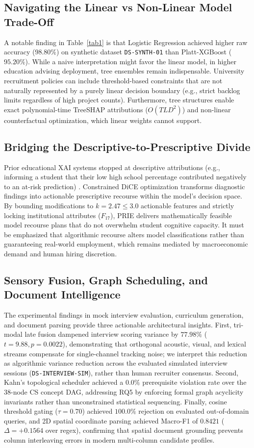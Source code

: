 \documentclass[conference]{IEEEtran}
\begin{document}
\subsection{Navigating the Linear vs Non-Linear Model Trade-Off}
A notable finding in Table~\ref{tab1} is that Logistic Regression achieved higher raw accuracy ($98.80\%$) on synthetic dataset \texttt{DS-SYNTH-01} than Platt-XGBoost ($95.20\%$). While a naive interpretation might favor the linear model, in higher education advising deployment, tree ensembles remain indispensable. University recruitment policies can include threshold-based constraints that are not naturally represented by a purely linear decision boundary (e.g., strict backlog limits regardless of high project counts). Furthermore, tree structures enable exact polynomial-time TreeSHAP attributions ($O(TLD^2)$) and non-linear counterfactual optimization, which linear weights cannot support.

\subsection{Bridging the Descriptive-to-Prescriptive Divide}
Prior educational XAI systems stopped at descriptive attributions (e.g., informing a student that their low high school percentage contributed negatively to an at-risk prediction) \cite{b16,b17}. Constrained DiCE optimization transforms diagnostic findings into actionable prescriptive recourse within the model's decision space. By bounding modifications to $k = 2.47 \le 3.0$ actionable features and strictly locking institutional attributes ($F_{17}$), PRIE delivers mathematically feasible model recourse plans that do not overwhelm student cognitive capacity. It must be emphasized that algorithmic recourse alters model classifications rather than guaranteeing real-world employment, which remains mediated by macroeconomic demand and human hiring discretion.

\subsection{Sensory Fusion, Graph Scheduling, and Document Intelligence}
The experimental findings in mock interview evaluation, curriculum generation, and document parsing provide three actionable architectural insights. First, tri-modal late fusion dampened interview scoring variance by $77.98\%$ ($t = 9.88, p = 0.0022$), demonstrating that orthogonal acoustic, visual, and lexical streams compensate for single-channel tracking noise; we interpret this reduction as algorithmic variance reduction across the evaluated simulated interview sessions (\texttt{DS-INTERVIEW-SIM}), rather than human recruiter consensus. Second, Kahn's topological scheduler achieved a $0.0\%$ prerequisite violation rate over the 38-node CS concept DAG, addressing RQ5 by enforcing formal graph acyclicity invariants rather than unconstrained statistical sequencing. Finally, cosine threshold gating ($\tau = 0.70$) achieved $100.0\%$ rejection on evaluated out-of-domain queries, and 2D spatial coordinate parsing achieved Macro-F1 of $0.8421$ ($\Delta = +0.1564$ over regex), confirming that spatial document grounding prevents column interleaving errors in modern multi-column candidate profiles.
\end{document}
